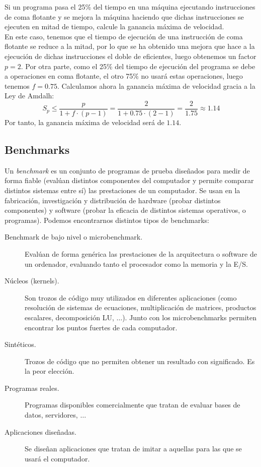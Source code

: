 \begin{ejemplo}
    Si un programa pasa el 25\% del tiempo en una máquina ejecutando instrucciones de coma flotante y se mejora la máquina haciendo que dichas instrucciones se ejecuten en mitad de tiempo, calcule la ganancia máxima de velocidad.\\

    En este caso, tenemos que el tiempo de ejecución de una instrucción de coma flotante se reduce a la mitad, por lo que se ha obtenido una mejora que hace a la ejecución de dichas instrucciones el doble de eficientes, luego obtenemos un factor $p = 2$. Por otra parte, como el 25\% del tiempo de ejecución del programa se debe a operaciones en coma flotante, el otro 75\% no usará estas operaciones, luego tenemos $f = 0.75$. Calculamos ahora la ganancia máxima de velocidad gracia a la Ley de Amdalh:
    \begin{equation*}
        S_p \leq \dfrac{p}{1+f\cdot(p-1)} = \dfrac{2}{1+0.75\cdot(2-1)}= \dfrac{2}{1.75} \approx 1.14
    \end{equation*}
    Por tanto, la ganancia máxima de velocidad será de $1.14$.
\end{ejemplo}

\subsection{Benchmarks}
Un \emph{benchmark} es un conjunto de programas de prueba diseñados para medir de forma fiable (evalúan distintos componentes del computador y permite comparar distintos sistemas entre sí) las prestaciones de un computador. Se usan en la fabricación, investigación y distribución de hardware (probar distintos componentes) y software (probar la eficacia de distintos sistemas operativos, o programas). Podemos encontrarnos distintos tipos de benchmarks:

\begin{description}
    \item [Benchmark de bajo nivel o microbenchmark.]
        Evalúan de forma genérica las prestaciones de la arquitectura o software de un ordenador, evaluando tanto el procesador como la memoria y la E/S.
    \item [Núcleos (kernels).]
        Son trozos de código muy utilizados en diferentes aplicaciones (como resolución de sistemas de ecuaciones, multiplicación de matrices, productos escalares, decomposición LU, $\ldots$). Junto con los microbenchmarks permiten encontrar los puntos fuertes de cada computador.
    \item [Sintéticos.]
        Trozos de código que no permiten obtener un resultado con significado. Es la peor elección.
    \item [Programas reales.]
        Programas disponibles comercialmente que tratan de evaluar bases de datos, servidores, $\ldots$
    \item [Aplicaciones diseñadas.]
        Se diseñan aplicaciones que tratan de imitar a aquellas para las que se usará el computador. 
\end{description}

\newpage
